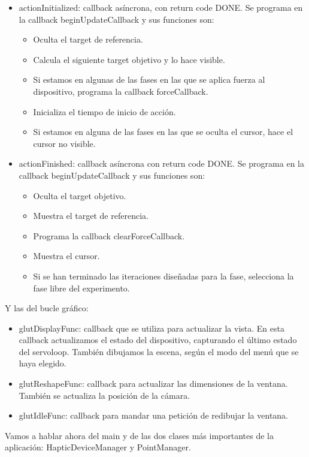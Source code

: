 \documentclass[a4paper,11pt, oneside]{book}
\begin{document}
\begin{itemize}
	\item actionInitialized: callback asíncrona, con return code DONE. Se programa en la callback beginUpdateCallback y sus funciones son:
	\begin{itemize}
		\item Oculta el target de referencia.
		\item Calcula el siguiente target objetivo y lo hace visible.
		\item Si estamos en algunas de las fases en las que se aplica fuerza al dispositivo, programa la callback forceCallback. 
		\item Inicializa el tiempo de inicio de acción.
		\item Si estamos en alguna de las fases en las que se oculta el cursor, hace el cursor no visible.
	\end{itemize}
	
	\item actionFinished: callback asíncrona con return code DONE. Se programa en la callback beginUpdateCallback y sus funciones son:
	\begin{itemize}
		\item Oculta el target objetivo.
		\item Muestra el target de referencia.
		\item Programa la callback clearForceCallback.
		\item Muestra el cursor.
		\item Si se han terminado las iteraciones diseñadas para la fase, selecciona la fase libre del experimento.
	\end{itemize}
\end{itemize}
Y las del bucle gráfico:
\begin{itemize}
	\item glutDisplayFunc: callback que se utiliza para actualizar la vista. En esta callback actualizamos el estado del dispositivo, capturando el último estado del servoloop. También dibujamos la escena, según el modo del menú que se haya elegido. 
	
	\item glutReshapeFunc: callback para actualizar las dimensiones de la ventana. También se actualiza la posición de la cámara.
	
	\item glutIdleFunc: callback para mandar una petición de redibujar la ventana.	
\end{itemize}

Vamos a hablar ahora del main y de las dos clases más importantes de la aplicación: HapticDeviceManager y PointManager.
\end{document}

